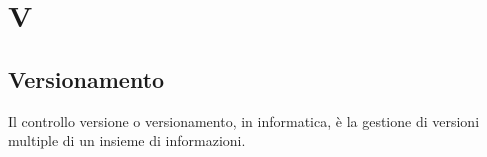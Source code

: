 \section{V}
	\subsection{Versionamento} 
		Il controllo versione o versionamento, in informatica, è la gestione di versioni multiple di un insieme di informazioni. 
